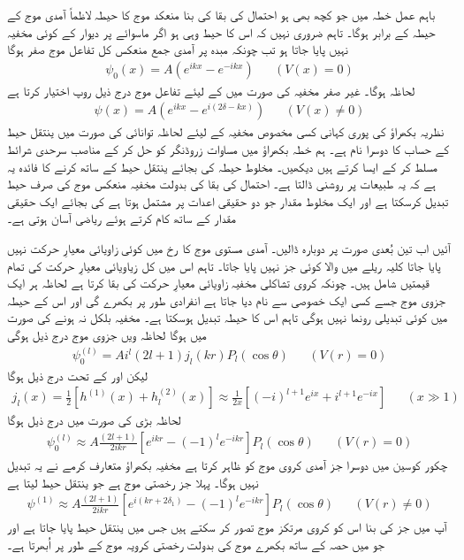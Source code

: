 باہم عمل خطہ  میں جو کچھ بھی ہو احتمال کی بقا کی بنا منعکد موج کا حیطہ لاظماً آمدی موج کے حیطہ کے برابر ہوگا۔ تاہم ضروری نہیں کہ اس کا حیط وہی ہو اگر ماسوائے  پر دیوار کے کوئی مخفیہ نہیں پایا جاتا ہو تب چونکہ مبدہ پر آمدی جمع منعکس کل تفاعل موج صفر ہوگا 
\begin{align}
	\psi_0(x) = A\left(e^{ikx}-e^{-ikx}\right)&&(V(x)=0)
\end{align}
لحاظہ  ہوگا۔ غیر صفر مخفیہ کی صورت میں  کے لیئے تفاعل موج درج ذیل روپ اختیار کرتا ہے
\begin{align}
	\psi(x) = A\left(e^{ikx}-e^{i(2\delta-kx)}\right)&&(V(x)\neq0)
\end{align}
نظریہ بکھراؤ کی پوری کہانی کسی مخصوص مخفیہ کے لیئے  لحاظہ توانائی  کی صورت میں ینتقل حیط کے حساب کا دوسرا نام ہے۔ ہم خطہ بکھراؤ  میں مساوات زروڈنگر کو حل کر کے مناصب سرحدی شرائط مسلط کر کے ایسا کرتے ہیں  دیکھیں۔ مخلوط حیطہ  کی بجائے ینتقل حیط کے ساتھ کرنے کا فائدہ یہ ہے کہ یہ طبیعات پر روشنی ڈالتا ہے۔ احتمال کی بقا کی بدولت مخفیہ منعکس موج کی صرف حیط تبدیل کرسکتا ہے اور ایک مخلوط مقدار جو دو حقیقی اعدات پر مشتمل ہوتا ہے کی بجائے ایک حقیقی مقدار کے ساتھ کام کرتے ہوئے ریاضی آسان ہوتی ہے۔

آئیں اب تین بُعدی صورت پر دوبارہ ڈالیں۔ آمدی مستوی موج  کا  رخ میں کوئی زاویائی معیارِ حرکت نہیں پایا جاتا کلیہ ریلے میں  والا کوئی جز نہیں پایا جاتا۔ تاہم اس میں کل زیاویائی معیارِ حرکت  کی تمام قیمتیں شامل ہیں۔ چونکہ کروی تشاکلی مخفیہ زاویائی معیارِ حرکت کی بقا کرتا ہے لحاظہ ہر ایک جزوی موج جسے کسی ایک خصوصی  سے نام دیا جاتا ہے انفرادی طور پر بکھرے گی اور اس کے حیطہ میں کوئی تبدیلی رونما نہیں ہوگی تاہم اس کا حیطہ تبدیل ہوسکتا ہے۔ مخفیہ بلکل نہ ہونے کی صورت میں  ہوگا لحاظہ ویں جزوی موج درج ذیل ہوگی 
\begin{align}
	\psi_0^{(l)} = Ai^l(2l+1)j_l(kr)P_l(\cos\theta)&&(V(r)=0)
\end{align}
لیکن  اور  کے تحت درج ذیل ہوگا
\begin{align}
	j_l(x) = \frac{1}{2}\left[h^{(1)}(x)+h_l^{(2)}(x)\right]\approx\frac{1}{2x}\left[(-i)^{l+1}e^{ix}+i^{l+1}e^{-ix}\right]&&(x\gg1)
\end{align}
لحاظہ بڑی  کی صورت میں درج ذیل ہوگا
\begin{align}
	\psi_0^{(l)}\approx A\frac{(2l+1)}{2ikr}\left[e^{ikr}-(-1)^le^{-ikr}\right]P_l(\cos\theta)&&(V(r)=0)
\end{align}
چکور کوسین میں دوسرا جز آمدی کروی موج کو ظاہر کرتا ہے مخفیہ بکھراؤ متعارف کرمے نے یہ تبدیل نہیں ہوگا۔ پہلا جز رخصتی موج ہے جو ینتقل حیط  لیتا ہے
\begin{align}
	\psi^{(1)}\approx A\frac{(2l+1)}{2ikr}\left[e^{i(kr+2\delta_1)}-(-1)^le^{-ikr}\right]P_l(\cos\theta)&&(V(r)\neq0)
\end{align}
آپ  میں  جز کی بنا اس کو کروی مرتکز موج تصور کر سکتے ہیں جس میں  ینتقل حیط پایا جاتا ہے اور جو  میں  حصہ کے ساتھ بکھرے موج کی بدولت رخصتی کرویہ موج کے طور پر اُبھرتا ہے۔

